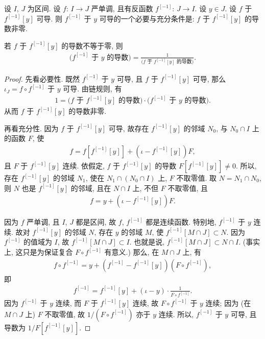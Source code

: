 \begin{theorem}
    设 $I$, $J$ 为区间.
    设 $f$: $I \to J$ 严单调,
    且有反函数 $f^{[-1]}$: $J \to I$.
    设 $y \in J$.
    设 $f$ 于 $f^{[-1]} [y]$ 可导.
    则 $f^{[-1]}$ 于 $y$ 可导的一个必要与充分条件是:
    $f$ 于 $f^{[-1]} [y]$ 的导数非零.

    若 $f$ 于 $f^{[-1]} [y]$ 的导数不等于零, 则
    \begin{align*}
        \text{($f^{[-1]}$ 于 $y$ 的导数)} = \frac{1}{\text{($f$ 于 $f^{[-1]} [y]$ 的导数)}}.
    \end{align*}
\end{theorem}

\begin{proof}
    先看必要性.
    既然 $f^{[-1]}$ 于 $y$ 可导,
    且 $f$ 于 $f^{[-1]} [y]$ 可导,
    那么 $\iota_J = f \circ f^{[-1]}$ 于 $y$ 可导.
    由链规则, 有
    \begin{align*}
        1 = \text{($f$ 于 $f^{[-1]} [y]$ 的导数)} \cdot \text{($f^{[-1]}$ 于 $y$ 的导数)}.
    \end{align*}
    从而 $f$ 于 $f^{[-1]} [y]$ 的导数非零.

    再看充分性.
    因为 $f$ 于 $f^{[-1]} [y]$ 可导,
    故存在 $f^{[-1]} [y]$ 的邻域 $N_0$,
    与 $N_0 \cap I$ 上的函数 $F$, 使
    \begin{align*}
        f = f[f^{[-1]} [y]] + (\iota - f^{[-1]} [y])F,
    \end{align*}
    且 $F$ 于 $f^{[-1]} [y]$ 连续.
    依假定, $f$ 于 $f^{[-1]} [y]$ 的导数
    $F[f^{[-1]} [y]] \neq 0$.
    所以, 存在 $f^{[-1]} [y]$ 的邻域 $N_1$,
    使在 $N_1 \cap (N_0 \cap I)$ 上, $F$ 不取零值.
    取 $N = N_1 \cap N_0$,
    则 $N$ 也是 $f^{[-1]} [y]$ 的邻域,
    且在 $N \cap I$ 上, 不但 $F$ 不取零值, 且
    \begin{align*}
        f = y + (\iota - f^{[-1]} [y])F.
    \end{align*}

    因为 $f$ 严单调, 且 $I$, $J$ 都是区间,
    故 $f$, $f^{[-1]}$ 都是连续函数.
    特别地, $f^{[-1]}$ 于 $y$ 连续.
    故对 $f^{[-1]} [y]$ 的邻域 $N$,
    存在 $y$ 的邻域 $M$, 使 $f^{[-1]} [M \cap J] \subset N$.
    因为 $f^{[-1]}$ 的值域为 $I$,
    故 $f^{[-1]} [M \cap J] \subset I$.
    也就是说, $f^{[-1]} [M \cap J] \subset N \cap I$.
    (事实上, 这只是为保证复合 $F \circ f^{[-1]}$ 有意义.)
    那么, 在 $M \cap J$ 上, 有
    \begin{align*}
        f \circ f^{[-1]} = y + (f^{[-1]} - f^{[-1]} [y]) (F \circ f^{[-1]}),
    \end{align*}
    即
    \begin{align*}
        f^{[-1]} = f^{[-1]} [y] + (\iota - y) \cdot \frac{1}{F \circ f^{[-1]}}.
    \end{align*}
    因为 $f^{[-1]}$ 于 $y$ 连续, 而 $F$ 于 $f^{[-1]} [y]$ 连续,
    故 $F \circ f^{[-1]}$ 于 $y$ 连续;
    因为 (在 $M \cap J$ 上) $F$ 不取零值,
    故 $1/(F \circ f^{[-1]})$ 亦于 $y$ 连续.
    所以, $f^{[-1]}$ 于 $y$ 可导, 且导数为 $1/F[f^{[-1]} [y]]$.
\end{proof}


